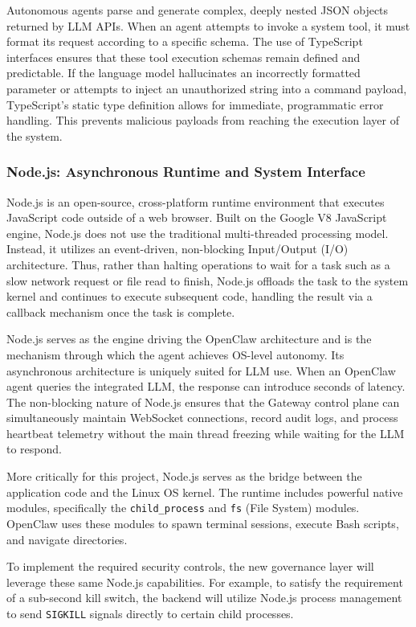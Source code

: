 \documentclass[a4paper]{report}
\begin{document}
Autonomous agents parse and generate complex, deeply nested JSON objects returned by LLM APIs. When an agent attempts to invoke a system tool, it must format its request according to a specific schema. The use of TypeScript interfaces ensures that these tool execution schemas remain defined and predictable. If the language model hallucinates an incorrectly formatted parameter or attempts to inject an unauthorized string into a command payload, TypeScript's static type definition allows for immediate, programmatic error handling. This prevents malicious payloads from reaching the execution layer of the system.

\subsubsection{Node.js: Asynchronous Runtime and System Interface}

Node.js is an open-source, cross-platform runtime environment that executes JavaScript code outside of a web browser. Built on the Google V8 JavaScript engine, Node.js does not use the traditional multi-threaded processing model. Instead, it utilizes an event-driven, non-blocking Input/Output (I/O) architecture. Thus, rather than halting operations to wait for a task such as a slow network request or file read to finish, Node.js offloads the task to the system kernel and continues to execute subsequent code, handling the result via a callback mechanism once the task is complete.

Node.js serves as the engine driving the OpenClaw architecture and is the mechanism through which the agent achieves OS-level autonomy. Its asynchronous architecture is uniquely suited for LLM use. When an OpenClaw agent queries the integrated LLM, the response can introduce seconds of latency. The non-blocking nature of Node.js ensures that the Gateway control plane can simultaneously maintain WebSocket connections, record audit logs, and process heartbeat telemetry without the main thread freezing while waiting for the LLM to respond.

More critically for this project, Node.js serves as the bridge between the application code and the Linux OS kernel. The runtime includes powerful native modules, specifically the \texttt{child\_process} and \texttt{fs} (File System) modules. OpenClaw uses these modules to spawn terminal sessions, execute Bash scripts, and navigate directories.

To implement the required security controls, the new governance layer will leverage these same Node.js capabilities. For example, to satisfy the requirement of a sub-second kill switch, the backend will utilize Node.js process management to send \texttt{SIGKILL} signals directly to certain child processes.
\end{document}
